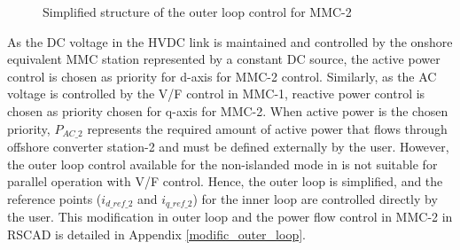 \begin{figure}[H]
\centering


\vspace{10mm}


\caption{Simplified structure of the outer loop control for MMC-2 \cite{saad2015modelisation}}

\end{figure}

As the \gls{DC} voltage in the \gls{HVDC} link is maintained and controlled by the onshore equivalent \gls{MMC} station represented by a constant \gls{DC} source, the active power control is chosen as priority for d-axis for \gls{MMC}-2 control. Similarly, as the \gls{AC} voltage is controlled by the V/F control in \gls{MMC}-1, reactive power control is chosen as priority chosen for q-axis for \gls{MMC}-2. When active power is the chosen priority, $P_{AC\_2}$ represents the required amount of active power that flows through offshore converter station-2 and must be defined externally by the user. However, the outer loop control available for the non-islanded mode in \cite{vrana2013cigre} is not suitable for parallel operation with V/F control. Hence, the outer loop is simplified, and the reference points ($i_{d\_ref\_2}$ and $i_{q\_ref\_2}$) for the inner loop are controlled directly by the user. This modification in outer loop and the power flow control in \gls{MMC}-2 in RSCAD is detailed in Appendix \ref{modific_outer_loop}.  


